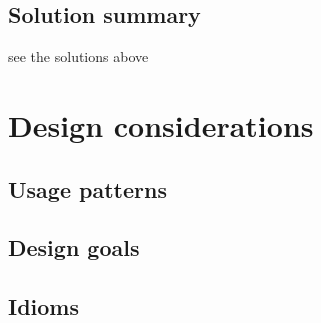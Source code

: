 \documentclass[conference]{IEEEtran}
\begin{document}

\subsection{Solution summary}
see the solutions above

\section{Design considerations}
\subsection{Usage patterns}
\subsection{Design goals}
\subsection{Idioms}
\end{document}
